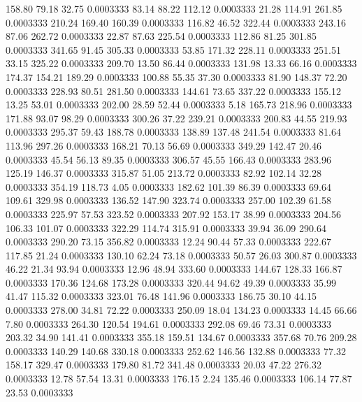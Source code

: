  158.80   79.18   32.75   0.0003333
  83.14   88.22  112.12   0.0003333
  21.28  114.91  261.85   0.0003333
 210.24  169.40  160.39   0.0003333
 116.82   46.52  322.44   0.0003333
 243.16   87.06  262.72   0.0003333
  22.87   87.63  225.54   0.0003333
 112.86   81.25  301.85   0.0003333
 341.65   91.45  305.33   0.0003333
  53.85  171.32  228.11   0.0003333
 251.51   33.15  325.22   0.0003333
 209.70   13.50   86.44   0.0003333
 131.98   13.33   66.16   0.0003333
 174.37  154.21  189.29   0.0003333
 100.88   55.35   37.30   0.0003333
  81.90  148.37   72.20   0.0003333
 228.93   80.51  281.50   0.0003333
 144.61   73.65  337.22   0.0003333
 155.12   13.25   53.01   0.0003333
 202.00   28.59   52.44   0.0003333
   5.18  165.73  218.96   0.0003333
 171.88   93.07   98.29   0.0003333
 300.26   37.22  239.21   0.0003333
 200.83   44.55  219.93   0.0003333
 295.37   59.43  188.78   0.0003333
 138.89  137.48  241.54   0.0003333
  81.64  113.96  297.26   0.0003333
 168.21   70.13   56.69   0.0003333
 349.29  142.47   20.46   0.0003333
  45.54   56.13   89.35   0.0003333
 306.57   45.55  166.43   0.0003333
 283.96  125.19  146.37   0.0003333
 315.87   51.05  213.72   0.0003333
  82.92  102.14   32.28   0.0003333
 354.19  118.73    4.05   0.0003333
 182.62  101.39   86.39   0.0003333
  69.64  109.61  329.98   0.0003333
 136.52  147.90  323.74   0.0003333
 257.00  102.39   61.58   0.0003333
 225.97   57.53  323.52   0.0003333
 207.92  153.17   38.99   0.0003333
 204.56  106.33  101.07   0.0003333
 322.29  114.74  315.91   0.0003333
  39.94   36.09  290.64   0.0003333
 290.20   73.15  356.82   0.0003333
  12.24   90.44   57.33   0.0003333
 222.67  117.85   21.24   0.0003333
 130.10   62.24   73.18   0.0003333
  50.57   26.03  300.87   0.0003333
  46.22   21.34   93.94   0.0003333
  12.96   48.94  333.60   0.0003333
 144.67  128.33  166.87   0.0003333
 170.36  124.68  173.28   0.0003333
 320.44   94.62   49.39   0.0003333
  35.99   41.47  115.32   0.0003333
 323.01   76.48  141.96   0.0003333
 186.75   30.10   44.15   0.0003333
 278.00   34.81   72.22   0.0003333
 250.09   18.04  134.23   0.0003333
  14.45   66.66    7.80   0.0003333
 264.30  120.54  194.61   0.0003333
 292.08   69.46   73.31   0.0003333
 203.32   34.90  141.41   0.0003333
 355.18  159.51  134.67   0.0003333
 357.68   70.76  209.28   0.0003333
 140.29  140.68  330.18   0.0003333
 252.62  146.56  132.88   0.0003333
  77.32  158.17  329.47   0.0003333
 179.80   81.72  341.48   0.0003333
  20.03   47.22  276.32   0.0003333
  12.78   57.54   13.31   0.0003333
 176.15    2.24  135.46   0.0003333
 106.14   77.87   23.53   0.0003333

